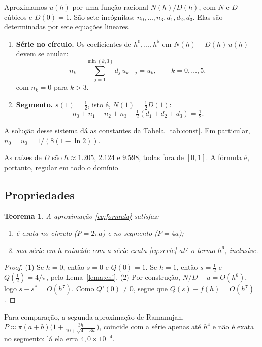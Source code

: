 \documentclass[11pt,a4paper]{article}
\newtheorem{teorema}{Teorema}
\theoremstyle{definition}
\theoremstyle{remark}
\begin{document}
Aproximamos $u(h)$ por uma função racional $N(h)/D(h)$, com $N$ e $D$ cúbicos
e $D(0)=1$. São sete incógnitas: $n_0,\dots,n_3,d_1,d_2,d_3$. Elas são
determinadas por sete equações lineares.
\begin{enumerate}
  \item \textbf{Série no círculo.} Os coeficientes de $h^0,\dots,h^5$ em
  $N(h)-D(h)\,u(h)$ devem se anular:
  \begin{equation}
    n_k-\sum_{j=1}^{\min(k,3)}d_j\,u_{k-j}=u_k,\qquad k=0,\dots,5,
  \end{equation}
  com $n_k=0$ para $k>3$.
  \item \textbf{Segmento.} $s(1)=\tfrac12$, isto é,
  $N(1)=\tfrac12D(1)$:
  \begin{equation}
    n_0+n_1+n_2+n_3-\tfrac12(d_1+d_2+d_3)=\tfrac12 .
  \end{equation}
\end{enumerate}
A solução desse sistema dá as constantes da Tabela~\ref{tab:const}. Em
particular, $n_0=u_0=1/(8(1-\ln2))$.

As raízes de $D$ são $h\approx1.205$, $2.124$ e $9.598$, todas fora de $[0,1]$.
A fórmula é, portanto, regular em todo o domínio.

\subsection{Propriedades}

\begin{teorema}
A aproximação \eqref{eq:formula} satisfaz:
\begin{enumerate}
  \item é exata no círculo ($P=2\pi a$) e no segmento ($P=4a$);
  \item sua série em $h$ coincide com a série exata \eqref{eq:serie} até o termo $h^6$, inclusive.
\end{enumerate}
\end{teorema}
\begin{proof}
(1) Se $h=0$, então $s=0$ e $Q(0)=1$. Se $h=1$, então $s=\tfrac12$ e $Q(\tfrac12)=4/\pi$,
pelo Lema~\ref{lema:chi}.
(2) Por construção, $N/D-u=O(h^6)$, logo $s-s^*=O(h^7)$. Como $Q'(0)\ne0$,
segue que $Q(s)-f(h)=O(h^7)$.
\end{proof}

Para comparação, a segunda aproximação de Ramanujan,
$P\approx\pi(a+b)\big(1+\frac{3h}{10+\sqrt{4-3h}}\big)$, coincide com a série
apenas até $h^4$ e não é exata no segmento: lá ela erra $4{,}0\times10^{-4}$.
\end{document}
